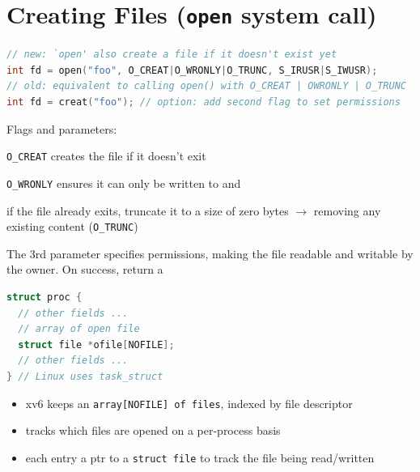 \section*{Creating Files (\texttt{open} system call)}
\begin{lstlisting}[language=c]
// new: `open' also create a file if it doesn't exist yet
int fd = open("foo", O_CREAT|O_WRONLY|O_TRUNC, S_IRUSR|S_IWUSR);
// old: equivalent to calling open() with O_CREAT | OWRONLY | O_TRUNC
int fd = creat("foo"); // option: add second flag to set permissions
\end{lstlisting}
Flags and parameters:
\begin{enumerate*}[label={\alph*.},font={\color{red!50!black}\bfseries}]
\item \texttt{O\_CREAT} creates the file if it doesn't exit
\item \texttt{O\_WRONLY} ensures it can only be written to and
\item if the file already exits, truncate it to a size of zero bytes $\to$ removing any existing content (\texttt{O\_TRUNC})
\end{enumerate*}
The 3rd parameter specifies permissions, making the file readable and writable by the owner. On success, return a \\
\begin{minipage}{.45\linewidth}
\begin{lstlisting}[language=c]
struct proc {
  // other fields ...
  // array of open file
  struct file *ofile[NOFILE];
  // other fields ...
} // Linux uses task_struct
\end{lstlisting}
\end{minipage}
\begin{minipage}{.55\linewidth}
  \flushleft
  \begin{itemize}
  \item xv6 keeps an \texttt{array[NOFILE] of files}, indexed by file descriptor
  \item tracks which files are opened on a per-process basis
  \item each entry a ptr to a \texttt{struct file} to track the file being read/written
  \end{itemize}
\end{minipage}
